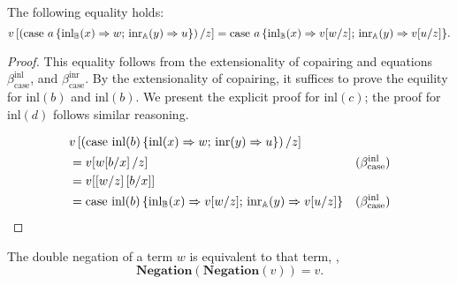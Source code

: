 


\begin{proposition} 
  The following equality holds:
  \begin{equation*}
   v \left[ \left(\text{case } a \,\{\mathrm{inl}_{\mathbb{B}}(x) \Rightarrow w ; \, \mathrm{inr}_{\mathbb{A}}(y) \Rightarrow u\}\right)  / z \right]  =  \text{case } a \,\{\mathrm{inl}_{\mathbb{B}}(x) \Rightarrow v[w/z] ; \, \mathrm{inr}_{\mathbb{A}}(y) \Rightarrow v[u/z]\}.
  \end{equation*}
\end{proposition}

  \begin{proof}
    
This equality follows from the extensionality of copairing and equations  $\beta_{\text{case}}^{\text{inl}}$, and $\beta_{\text{case}}^{\text{inr}}$. 
By the extensionality of copairing, it suffices to prove the equility for  $\text{inl}(b)$ and $\text{inl}(b)$.
We present the explicit proof for $\text{inl}(c)$; the proof for  $\text{inl}(d)$ follows similar reasoning.

\begin{equation*}
\begin{split}
  & v \left[ \left(\text{case } \text{inl}(b) \,\{\mathrm{inl}(x) \Rightarrow w ; \, \mathrm{inr}(y) \Rightarrow u\}\right)  / z \right] & \\
  & =  v [w[b/x]\,/z] & (\beta_{\text{case}}^{\text{inl}})\\
  & =   v [[w/z]\,[b/x]]    \\
   & =  \text{case } \text{inl}(b) \,\{\mathrm{inl}_{\mathbb{B}}(x) \Rightarrow v[w/z] ; \, \mathrm{inr}_{\mathbb{A}}(y) \Rightarrow v[u/z]\}   & (\beta_{\text{case}}^{\text{inl}})
\end{split}
\end{equation*}
  \end{proof}


\begin{lemma} \label{lem:dneg}
  The double negation of a term $w$ is equivalent to that term, \ie, 
  $$\textbf{Negation} (\textbf{Negation} (v) ) = v.$$
\end{lemma}

